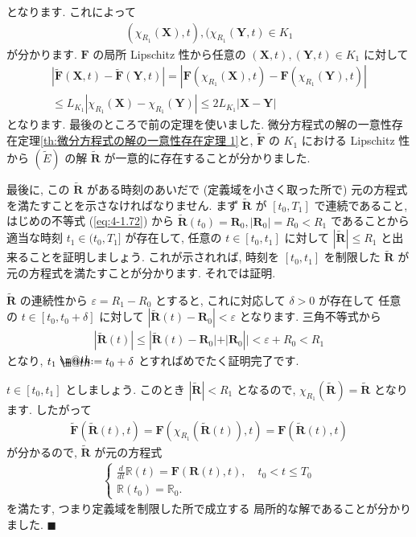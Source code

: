 \documentclass[openany, a4paper, oneside]{book}
\makeatletter
\newcommand*{\defeq}{\mathrel{\rlap{%
\raisebox{0.3ex}{$\m@th\cdot$}}%
\raisebox{-0.3ex}{$\m@th\cdot$}}%
=}
\theoremstyle{break}
\theoremstyle{breakdefn}
\newcommand{\abs}[1]{\left|#1\right|}
\newcommand{\bbR}{\mathbb{R}}
\newcommand{\bR}{\mathbb{R}}
\newcommand{\bs}{\blacksquare}
\newcommand{\vep}{\varepsilon}
\makeatother
\begin{document}
となります.
これによって
\begin{gather}
( \chi_{R_1} ( \bm{X} ) , t ) , ( \chi_{R_1} ( \bm{Y} , t ) \in K_1
\end{gather}
が分かります.
$\bm{F}$ の局所 Lipschitz 性から任意の $(\bm{X} , t ) , ( \bm{Y} , t )  \in K_1$ に対して
\begin{gather}
\abs{\tilde{ \bm{F} } ( \bm{X} , t ) - \tilde{ \bm{F} } ( \bm{Y} , t )}
=
\abs{\bm{F} ( \chi_{R_1} ( \bm{X} ) , t ) - \bm{F} ( \chi_{R_1} ( \bm{Y} ) , t )}\\
\leq
L_{K_1} | \chi_{R_1} ( \bm{X} ) - \chi_{R_1} ( \bm{Y} )  |
\leq
2 L_{K_1} | \bm{X} -  \bm{Y} |
\end{gather}
となります.
最後のところで前の定理を使いました.
微分方程式の解の一意性存在定理\ref{th:微分方程式の解の一意性存在定理 1}と,
$\tilde{ \bm{F} }$ の $K_1$ における Lipschitz 性から
$( \tilde{E} )$ の解 $\tilde{ \bm{R} }$ が一意的に存在することが分かりました.

最後に, この $\tilde{ \bm{R} }$ がある時刻のあいだで (定義域を小さく取った所で)
元の方程式を満たすことを示さなければなりません.
まず $\tilde { \bm{R} }$ が $[ t_0 , T_1 ]$ で連続であること,
はじめの不等式 (\ref{eq:4-1.72}) から
$\tilde{ \bm{R} } (t_0) = \bm{R}_0 , | \bm{R}_0 | = R_0 < R_1$
であることから
適当な時刻 $t_1 \in ( t_0 , T_1]$ が存在して, 任意の
$t \in [t_0 , t_1]$ に対して
$|\tilde{ \bm{R} }| \leq R_1$ と出来ることを証明しましょう.
これが示されれば, 時刻を $[t_0 , t_1]$ を制限した $\tilde{ \bm{R} }$ が元の方程式を満たすことが分かります.
それでは証明.

$\tilde{ \bm{R} }$ の連続性から $\vep = R_1 - R_0$ とすると,
これに対応して $\delta > 0$ が存在して
任意の $t \in [t_0 , t_0 + \delta]$ に対して
$| \tilde{ \bm{R} } (t) - \bm{R}_0 | < \vep$ となります.
三角不等式から
\begin{gather}
\abs{\tilde{ \bm{R} } (t)}
\leq
\abs{\tilde{ \bm{R} } (t) - \bm{R}_0 | + | \bm{R}_0}|
<
\vep + R_0
<
R_1
\end{gather}
となり,  $t_1 \defeq t_0 + \delta$ とすればめでたく証明完了です.

$t \in [ t_0 , t_1 ]$ としましょう.
このとき $| \tilde{ \bm{R} } | < R_1$ となるので,
$\chi _{R_1} ( \tilde{ \bm{R} } ) = \tilde{ \bm{R} }$ となります.
したがって
\begin{gather}
\tilde{ \bm{F} } ( \tilde{ \bm{R} }(t) , t)
=
\bm{F} ( \chi_{R_1} ( \tilde{ \bm{R} } (t) ) , t )
=
\bm{F} ( \tilde{\bm{R}}(t) , t )
\end{gather}
が分かるので,  $\tilde{\bm{R}}$ が元の方程式
\begin{gather}
\begin{cases}
\frac{d} {dt} \bbR (t) = \bm{F} ( \bm{R} (t) , t ), \quad t_0 < t \leq T_0 \\
\bbR (t_0) = \bR_0 .
\end{cases}
\end{gather}
を満たす, つまり定義域を制限した所で成立する
局所的な解であることが分かりました.  $\bs$
\end{document}
